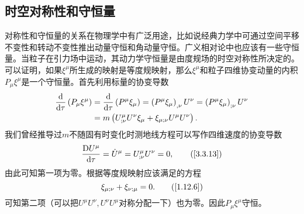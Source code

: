 \documentclass[11pt, a4paper, oneside, onecolumn]{ctexart}
\numberwithin{equation}{subsection}
\begin{document}
\subsection{时空对称性和守恒量}
对称性和守恒量的关系在物理学中有广泛用途，比如说经典力学中可通过空间平移不变性和转动不变性推出动量守恒和角动量守恒。广义相对论中也应该有一些守恒量。当粒子在引力场中运动，其动力学守恒量是由度规场的时空对称性所决定的。可以证明，如果$\xi^{\mu}$所生成的映射是等度规映射，那么$\xi^{\mu}$和粒子四维协变动量的内积$P_{\mu}\xi^{\mu}$是一个守恒量。首先利用标量的协变导数
\begin{align}
\frac{\mathrm{d}}{\mathrm{d}\tau}\left(P_{\mu}\xi^{\mu}\right)&=\frac{\mathrm{d}}{\mathrm{d}\tau}\left(P^{\mu}\xi_{\mu}\right)=\left(P^{\mu}\xi_{\mu}\right)_{,\nu}U^{\nu}=\left(P^{\mu}\xi_{\mu}\right)_{;\nu}U^{\nu}\notag\\
&=m\left(U^{\mu}_{;\nu}U^{\nu}\xi_{\mu}+\xi_{\mu;\nu}U^{\mu}U^{\nu}\right).
\end{align}
我们曾经推导过$m$不随固有时变化时测地线方程可以写作四维速度的协变导数
\begin{equation}
\dfrac{\mathrm{D}U^{\mu}}{\mathrm{d}\tau}=\dot{U}^{\mu}=U^{\mu}_{;\nu}U^{\nu}=0,\tag{\ref{3.3.13}}
\end{equation}
由此可知第一项为零。根据等度规映射应该满足的方程
\begin{equation}
\xi_{\mu;\nu}+\xi_{\nu;\mu}=0.\tag{\ref{1.12.6}}
\end{equation}
可知第二项（可以把$U^{\mu}U^{\nu},U^{\nu}U^{\mu}$对称分配一下）也为零。因此$P_{\mu}\xi^{\mu}$守恒。
\end{document}
